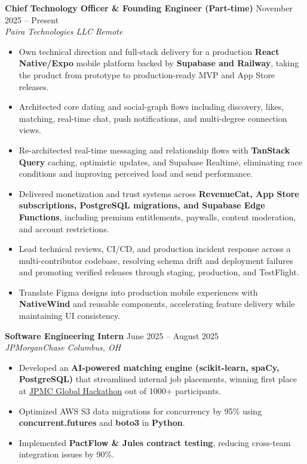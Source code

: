 \documentclass[letterpaper,11pt]{article}
\newcommand{\resumeItem}[1]{
  \item\small{
    {#1 \vspace{-2pt}}
  }
}
\newcommand{\resumeSubheading}[4]{
  \vspace{-2pt}\item
  \textbf{#1} \hfill #2 \\
  \textit{\small#3} \hfill \textit{\small #4} \\
  \vspace{-7pt} %
}
\newcommand{\resumeItemListStart}{\begin{itemize}}
\newcommand{\resumeItemListEnd}{\end{itemize}\vspace{-5pt}}
\begin{document}
    \resumeSubheading
      {Chief Technology Officer \& Founding Engineer (Part-time)}{November 2025 -- Present}
      {Paira Technologies LLC}{Remote}
    \resumeItemListStart
        \resumeItem{Own technical direction and full-stack delivery for a production \textbf{React Native/Expo} mobile platform backed by \textbf{Supabase and Railway}, taking the product from prototype to production-ready MVP and App Store releases.}
        \resumeItem{Architected core dating and social-graph flows including discovery, likes, matching, real-time chat, push notifications, and multi-degree connection views.}
        \resumeItem{Re-architected real-time messaging and relationship flows with \textbf{TanStack Query} caching, optimistic updates, and Supabase Realtime, eliminating race conditions and improving perceived load and send performance.}
        \resumeItem{Delivered monetization and trust systems across \textbf{RevenueCat, App Store subscriptions, PostgreSQL migrations, and Supabase Edge Functions}, including premium entitlements, paywalls, content moderation, and account restrictions.}
        \resumeItem{Lead technical reviews, CI/CD, and production incident response across a multi-contributor codebase, resolving schema drift and deployment failures and promoting verified releases through staging, production, and TestFlight.}
        \resumeItem{Translate Figma designs into production mobile experiences with \textbf{NativeWind} and reusable components, accelerating feature delivery while maintaining UI consistency.}
    \resumeItemListEnd

    \resumeSubheading
      {Software Engineering Intern}{June 2025 -- August 2025}
      {JPMorganChase}{Columbus, OH}
    \resumeItemListStart
        \resumeItem{Developed an \textbf{AI-powered matching engine (scikit-learn, spaCy, PostgreSQL)} that streamlined internal job placements, winning first place at \underline{\href{https://www.linkedin.com/posts/indi-de-silva_at-jpmorganchase-our-internship-program-activity-7355579081490354177-NYLE}{JPMC Global Hackathon}} out of 1000+ participants.}
        \resumeItem{Optimized AWS S3 data migrations for concurrency by 95\% using \textbf{concurrent.futures} and \textbf{boto3} in \textbf{Python}.}
        \resumeItem{Implemented \textbf{PactFlow \& Jules contract testing}, reducing cross-team integration issues by 90\%.}
    \resumeItemListEnd
\end{document}
